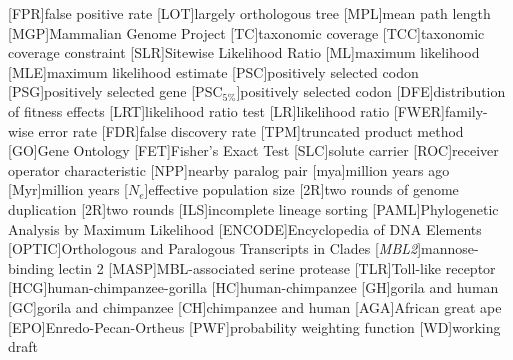 
[FPR]{false positive rate}
[LOT]{largely orthologous tree}
[MPL]{mean path length}
[MGP]{Mammalian Genome Project}
[TC]{taxonomic coverage}
[TCC]{taxonomic coverage constraint}
[SLR]{Sitewise Likelihood Ratio}
[ML]{maximum likelihood}
[MLE]{maximum likelihood estimate}
[PSC]{positively selected codon}
[PSG]{positively selected gene}
[PSC$_{5\%}$]{positively selected codon}
[DFE]{distribution of fitness effects}
[LRT]{likelihood ratio test}
[LR]{likelihood ratio}
[FWER]{family-wise error rate}
[FDR]{false discovery rate}
[TPM]{truncated product method}
[GO]{Gene Ontology}
[FET]{Fisher's Exact Test}
[SLC]{solute carrier}
[ROC]{receiver operator characteristic}
[NPP]{nearby paralog pair}
[mya]{million years ago}
[Myr]{million years}
[$N_{e}$]{effective population size}
[2R]{two rounds of genome duplication}
[2R]{two rounds}
[ILS]{incomplete lineage sorting}
[PAML]{Phylogenetic Analysis by Maximum Likelihood}
[ENCODE]{Encyclopedia of DNA Elements}
[OPTIC]{Orthologous and Paralogous Transcripts in Clades}
[\emph{MBL2}]{mannose-binding lectin 2}
[MASP]{MBL-associated serine protease}
[TLR]{Toll-like receptor}
[HCG]{human-chimpanzee-gorilla}
[HC]{human-chimpanzee}
[GH]{gorila and human}
[GC]{gorila and chimpanzee}
[CH]{chimpanzee and human}
[AGA]{African great ape}
[EPO]{Enredo-Pecan-Ortheus}
[PWF]{probability weighting function}
[WD]{working draft}

\newcommand{\tocite}[2]{}
\newcommand{\changeme}[1]{#1\xspace}

\newcommand{\TODO}[1]{\textcolor{red}{TODO} \todo{#1}\xspace}
\newcommand{\draft}[1]{\textcolor{gray}{[#1]}\xspace}

\newcommand{\gene}[1]{\emph{#1}}
\newcommand{\species}[1]{\emph{#1}}

\newcommand{\ntrees}{16,477\xspace}

